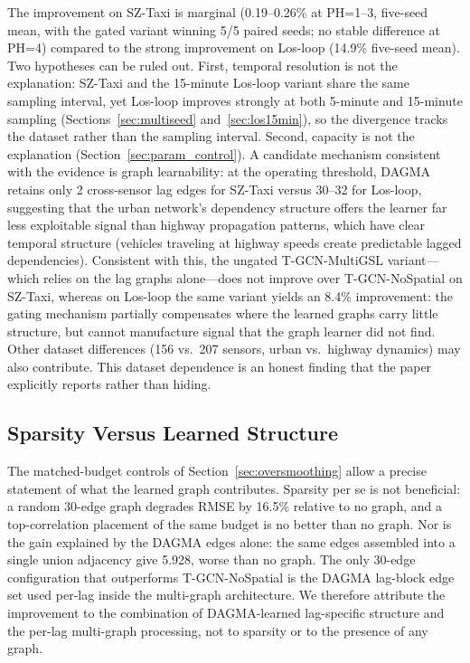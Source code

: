 The improvement on SZ-Taxi is marginal (0.19--0.26\% at PH=1--3, five-seed mean, with the gated variant winning 5/5 paired seeds; no stable difference at PH=4) compared to the strong improvement on Los-loop (14.9\% five-seed mean). Two hypotheses can be ruled out. First, temporal resolution is not the explanation: SZ-Taxi and the 15-minute Los-loop variant share the same sampling interval, yet Los-loop improves strongly at both 5-minute and 15-minute sampling (Sections~\ref{sec:multiseed} and~\ref{sec:los15min}), so the divergence tracks the dataset rather than the sampling interval. Second, capacity is not the explanation (Section~\ref{sec:param_control}). A candidate mechanism consistent with the evidence is graph learnability: at the operating threshold, DAGMA retains only 2 cross-sensor lag edges for SZ-Taxi versus 30--32 for Los-loop, suggesting that the urban network's dependency structure offers the learner far less exploitable signal than highway propagation patterns, which have clear temporal structure (vehicles traveling at highway speeds create predictable lagged dependencies). Consistent with this, the ungated T-GCN-MultiGSL variant---which relies on the lag graphs alone---does not improve over T-GCN-NoSpatial on SZ-Taxi, whereas on Los-loop the same variant yields an 8.4\% improvement: the gating mechanism partially compensates where the learned graphs carry little structure, but cannot manufacture signal that the graph learner did not find. Other dataset differences (156 vs.\ 207 sensors, urban vs.\ highway dynamics) may also contribute. This dataset dependence is an honest finding that the paper explicitly reports rather than hiding.

\subsection{Sparsity Versus Learned Structure}

The matched-budget controls of Section~\ref{sec:oversmoothing} allow a precise statement of what the learned graph contributes. Sparsity per se is not beneficial: a random 30-edge graph degrades RMSE by 16.5\% relative to no graph, and a top-correlation placement of the same budget is no better than no graph. Nor is the gain explained by the DAGMA edges alone: the same edges assembled into a single union adjacency give 5.928, worse than no graph. The only 30-edge configuration that outperforms T-GCN-NoSpatial is the DAGMA lag-block edge set used per-lag inside the multi-graph architecture. We therefore attribute the improvement to the combination of DAGMA-learned lag-specific structure and the per-lag multi-graph processing, not to sparsity or to the presence of any graph.

